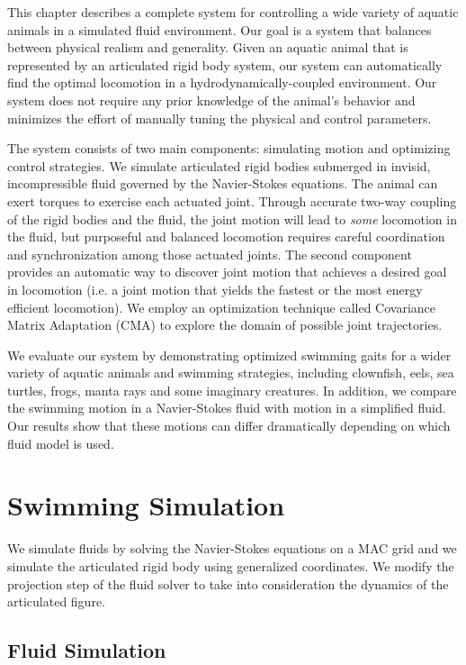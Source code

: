 This chapter describes a complete system for controlling a wide variety of
aquatic animals in a simulated fluid environment. Our goal is a system
that balances between physical realism and generality. Given an aquatic
animal that is represented by an articulated rigid body system, our system
can automatically find the optimal locomotion in a
hydrodynamically-coupled environment. Our system does not require any
prior knowledge of the animal's behavior and minimizes the effort of
manually tuning the physical and control parameters.

The system consists of two main components: simulating motion and
optimizing control strategies. We simulate articulated rigid bodies
submerged in invisid, incompressible fluid governed by the Navier-Stokes
equations. The animal can exert torques to exercise each actuated
joint. Through accurate two-way coupling of the rigid bodies and the
fluid, the joint motion will lead to \emph{some} locomotion in the
fluid, but purposeful and balanced locomotion requires careful
coordination and synchronization among those actuated joints.  The
second component provides an automatic way to discover joint motion
that achieves a desired goal in locomotion (i.e. a joint motion that
yields the fastest or the most energy efficient locomotion).  We
employ an optimization technique called Covariance Matrix Adaptation
(CMA) to explore the domain of possible joint trajectories.

We evaluate our system by demonstrating optimized swimming gaits for a
wider variety of aquatic animals and swimming strategies, including
clownfish, eels, sea turtles, frogs, manta rays and some imaginary
creatures. In addition, we compare the swimming motion in a Navier-Stokes
fluid with motion in a simplified fluid. Our results show that these
motions can differ dramatically depending on which fluid model is used.

\section{Swimming Simulation}

We simulate fluids by solving the Navier-Stokes equations on a MAC grid
and we simulate the articulated rigid body using generalized coordinates.
We modify the projection step of the fluid solver to take into
consideration the dynamics of the articulated figure.

\subsection{Fluid Simulation}

